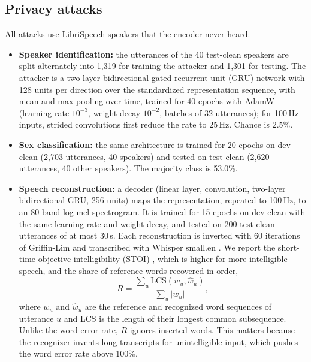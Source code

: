 \documentclass[11pt]{article}
\begin{document}
\subsection{Privacy attacks}
\label{sec:attacks}
All attacks use LibriSpeech speakers that the encoder never heard.
\begin{itemize}
\item \textbf{Speaker identification:} the utterances of the 40 test-clean speakers are split alternately into 1,319 for training the attacker and 1,301 for testing. The attacker is a two-layer bidirectional gated recurrent unit (GRU) network with 128 units per direction over the standardized representation sequence, with mean and max pooling over time, trained for 40 epochs with AdamW (learning rate $10^{-3}$, weight decay $10^{-2}$, batches of 32 utterances); for 100\,Hz inputs, strided convolutions first reduce the rate to 25\,Hz. Chance is 2.5\%.
\item \textbf{Sex classification:} the same architecture is trained for 20 epochs on dev-clean (2,703 utterances, 40 speakers) and tested on test-clean (2,620 utterances, 40 other speakers). The majority class is 53.0\%.
\item \textbf{Speech reconstruction:} a decoder (linear layer, convolution, two-layer bidirectional GRU, 256 units) maps the representation, repeated to 100\,Hz, to an 80-band log-mel spectrogram. It is trained for 15 epochs on dev-clean with the same learning rate and weight decay, and tested on 200 test-clean utterances of at most 30\,s. Each reconstruction is inverted with 60 iterations of Griffin-Lim \citep{griffin1984signal} and transcribed with Whisper small.en \citep{radford2023whisper}. We report the short-time objective intelligibility (STOI) \citep{taal2011stoi}, which is higher for more intelligible speech, and the share of reference words recovered in order,
\begin{equation}
R = \frac{\sum_u \mathrm{LCS}(w_u, \hat w_u)}{\sum_u |w_u|},
\label{eq:recall}
\end{equation}
where $w_u$ and $\hat w_u$ are the reference and recognized word sequences of utterance $u$ and LCS is the length of their longest common subsequence. Unlike the word error rate, $R$ ignores inserted words. This matters because the recognizer invents long transcripts for unintelligible input, which pushes the word error rate above 100\%.
\end{itemize}
\end{document}
